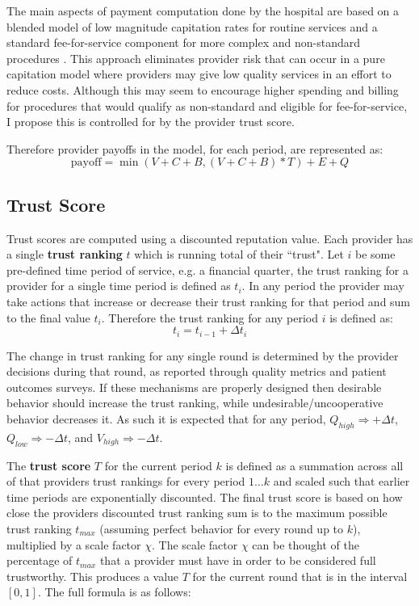 \documentclass{article}
\begin{document}
The main aspects of payment computation done by the hospital are based on a blended model of low magnitude capitation rates for routine services and a standard fee-for-service component for more complex and non-standard procedures \cite{blended}. This approach eliminates provider risk that can occur in a pure capitation model where providers may give low quality services in an effort to reduce costs. Although this may seem to encourage higher spending and billing for procedures that would qualify as non-standard and eligible for fee-for-service, I propose this is controlled for by the provider trust score.

Therefore provider payoffs in the model, for each period, are represented as:
\begin{equation} \label{eq:ptnm}
    \text{payoff} = \min(V + C + B, (V + C + B) * T) + E + Q
\end{equation}

\subsection{Trust Score} \label{sec:trustscore}
Trust scores are computed using a discounted reputation value. Each provider has a single \textbf{trust ranking} $t$ which is running total of their ``trust". Let $i$ be some pre-defined time period of service, e.g. a financial quarter, the trust ranking for a provider for a single time period is defined as $t_i$. In any period the provider may take actions that increase or decrease their trust ranking for that period and sum to the final value $t_i$. Therefore the trust ranking for any period $i$ is defined as:
\begin{equation}
    t_i = t_{i - 1} + \Delta t_i
\end{equation}

The change in trust ranking for any single round is determined by the provider decisions during that round, as reported through quality metrics and patient outcomes surveys. If these mechanisms are properly designed then desirable behavior should increase the trust ranking, while undesirable/uncooperative behavior decreases it. As such it is expected that for any period, $Q_{high} \Rightarrow +\Delta t$, $Q_{low} \Rightarrow -\Delta t$, and $V_{high} \Rightarrow -\Delta t$.

The \textbf{trust score} $T$ for the current period $k$ is defined as a summation across all of that providers trust rankings for every period $1 \dots k$ and scaled such that earlier time periods are exponentially discounted. The final trust score is based on how close the providers discounted trust ranking sum is to the maximum possible trust ranking $t_{max}$ (assuming perfect behavior for every round up to $k$), multiplied by a scale factor $\chi$. The scale factor $\chi$ can be thought of the percentage of $t_{max}$ that a provider must have in order to be considered full trustworthy. This produces a value $T$ for the current round that is in the interval $[0, 1]$. The full formula is as follows:
\end{document}

